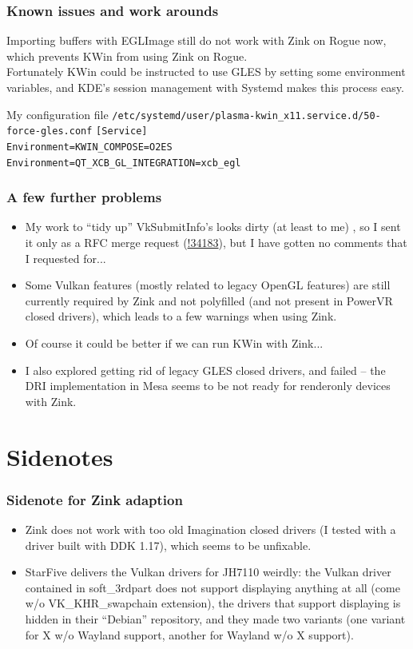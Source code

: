 \documentclass{beamer}
\begin{document}
\begin{frame}
	\frametitle{Known issues and work arounds}
	Importing buffers with EGLImage still do not work with Zink on Rogue now, which prevents KWin from using Zink on Rogue. \\
	Fortunately KWin could be instructed to use GLES by setting some environment variables, and KDE's session management with Systemd makes this process easy. \\
	\begin{block}{My configuration file \texttt{/etc/systemd/user/plasma-kwin\_x11.service.d/50-force-gles.conf}}
		\texttt{[Service] \\
			Environment=KWIN\_COMPOSE=O2ES \\
			Environment=QT\_XCB\_GL\_INTEGRATION=xcb\_egl
		}
	\end{block}
\end{frame}

\begin{frame}
	\frametitle{A few further problems}
	\begin{itemize}
		\item My work to ``tidy up'' VkSubmitInfo's looks dirty (at least to me) , so I sent it only as a RFC merge request (\href{https://gitlab.freedesktop.org/mesa/mesa/-/merge_requests/34183}{!34183}), but I have gotten no comments that I requested for...
		\item Some Vulkan features (mostly related to legacy OpenGL features) are still currently required by Zink and not polyfilled (and not present in PowerVR closed drivers), which leads to a few warnings when using Zink.
		\item Of course it could be better if we can run KWin with Zink...
		\item I also explored getting rid of legacy GLES closed drivers, and failed -- the DRI implementation in Mesa seems to be not ready for renderonly devices with Zink.
	\end{itemize}
\end{frame}

\section{Sidenotes}

\begin{frame}
	\frametitle{Sidenote for Zink adaption}
	\begin{itemize}
		\item Zink does not work with too old Imagination closed drivers (I tested with a driver built with DDK 1.17), which seems to be unfixable.
		\item StarFive delivers the Vulkan drivers for JH7110 weirdly: the Vulkan driver contained in soft\_3rdpart does not support displaying anything at all (come w/o VK\_KHR\_swapchain extension), the drivers that support displaying is hidden in their ``Debian'' repository, and they made two variants (one variant for X w/o Wayland support, another for Wayland w/o X support).
	\end{itemize}
\end{frame}
\end{document}
